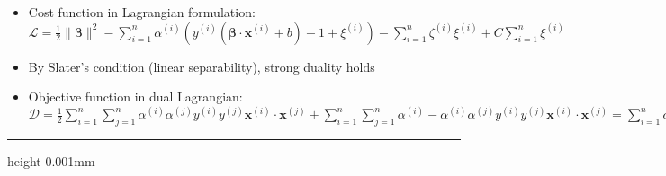 \begin{itemize}
\begin{itemize}
        \item $\xi^{(i)} \geq 0$
    \end{itemize}
    \item Cost function in Lagrangian formulation: $\mathcal{L} = \frac{1}{2} \| \boldsymbol{\beta} \|^2 - \sum_{i=1}^n \alpha^{(i)} (y^{(i)} (\boldsymbol{\beta} \cdot \boldsymbol{x}^{(i)} + b) - 1 + \xi^{(i)}) - \sum_{i=1}^n \zeta^{(i)} \xi^{(i)} + C \sum_{i=1}^n \xi^{(i)}$
    \item By Slater's condition (linear separability), strong duality holds
    \item Objective function in dual Lagrangian: $\mathcal{D} = \frac{1}{2}  \sum_{i=1}^n  \sum_{j=1}^n \alpha^{(i)}\alpha^{(j)} y^{(i)}y^{(j)} \boldsymbol{x}^{(i)} \cdot \boldsymbol{x}^{(j)} + \sum_{i=1}^n  \sum_{j=1}^n \alpha^{(i)} - \alpha^{(i)}\alpha^{(j)} y^{(i)}y^{(j)} \boldsymbol{x}^{(i)} \cdot \boldsymbol{x}^{(j)} = \sum_{i=1}^n \alpha^{(i)} - \frac{1}{2}  \sum_{i=1}^n  \sum_{j=1}^n \alpha^{(i)}\alpha^{(j)} y^{(i)}y^{(j)} \boldsymbol{x}^{(i)} \cdot \boldsymbol{x}^{(j)}$
\end{itemize}

{\color{lightgray}\hrule height 0.001mm}

